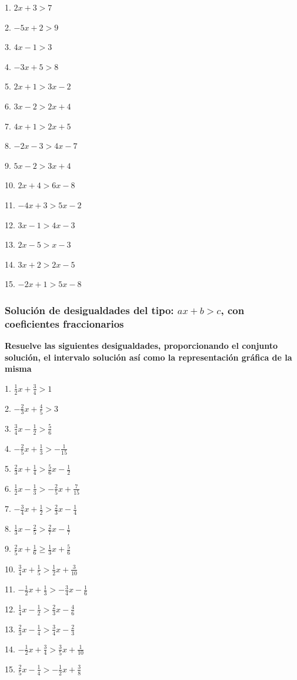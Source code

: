 \documentclass[12pt]{article}
\begin{document}
\begin{multicols}{2}
1. $2x+3>7$

2. $-5x+2>9$

3. $4x-1>3$

4. $-3x+5>8$

5. $2x+1>3x-2$

6. $3x-2>2x+4$

7. $4x+1>2x+5$

8. $-2x-3>4x-7$

9. $5x-2>3x+4$

10. $2x+4>6x-8$

11. $-4x+3>5x-2$

12. $3x-1>4x-3$

13. $2x-5>x-3$

14. $3x+2>2x-5$

15. $-2x+1>5x-8$
\end{multicols}

\subsubsection{\texorpdfstring{Solución de desigualdades del tipo:
\(ax+b>c\), con coeficientes
fraccionarios}{Solución de desigualdades del tipo: ax+b\textgreater c, con coeficientes fraccionarios}}\label{soluciuxf3n-de-desigualdades-del-tipo-axbc-con-coeficientes-fraccionarios}
\textbf{Resuelve las siguientes desigualdades, proporcionando el
conjunto solución, el intervalo solución así como la representación
gráfica de la misma}

\begin{multicols}{2}

1. $\frac{1}{2}x+\frac{3}{4}>1$

2. $-\frac{2}{3}x+\frac{4}{5}>3$

3. $\frac{3}{4}x-\frac{1}{2}>\frac{5}{6}$

4. $-\frac{2}{5}x+\frac{1}{3}>-\frac{1}{15}$

5. $\frac{2}{3}x+\frac{1}{4}>\frac{5}{6}x-\frac{1}{2}$

6. $\frac{1}{2}x-\frac{1}{3}>-\frac{2}{5}x+\frac{7}{15}$

7. $-\frac{3}{4}x+\frac{1}{2}>\frac{2}{3}x-\frac{1}{4}$

8. $\frac{1}{3}x-\frac{2}{5}>\frac{2}{7}x-\frac{1}{7}$

9. $\frac{2}{5}x+\frac{1}{6}\geq\frac{1}{3}x+\frac{5}{6}$

10. $\frac{3}{4}x+\frac{1}{5}>\frac{1}{2}x+\frac{3}{10}$

11. $-\frac{1}{2}x+\frac{1}{3}>-\frac{3}{4}x-\frac{1}{6}$

12. $\frac{1}{4}x-\frac{1}{2}>\frac{2}{3}x-\frac{4}{6}$

13. $\frac{2}{3}x-\frac{1}{4}>\frac{3}{4}x-\frac{2}{3}$

14. $-\frac{1}{2}x+\frac{3}{4}>\frac{3}{5}x+\frac{1}{10}$

15. $\frac{2}{5}x-\frac{1}{4}>-\frac{1}{2}x+\frac{3}{8}$

\end{multicols}
\end{document}
